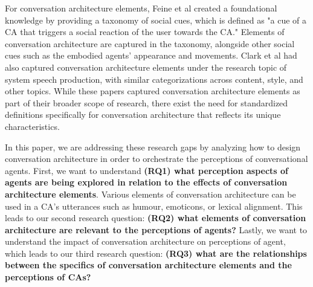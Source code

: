 \documentclass[sigconf,screen,review, anonymous]{acmart}
\begin{document}
For conversation architecture elements, Feine et al \cite{feine2019taxonomy} created a foundational knowledge by providing a taxonomy of social cues, which is defined as "a cue of a CA that triggers a social reaction of the user towards the CA." Elements of conversation architecture are captured in the taxonomy, alongside other social cues such as the embodied agents' appearance and movements. Clark et al \cite{clark2019state} had also captured conversation architecture elements under the research topic of system speech production, with similar categorizations across content, style, and other topics. While these papers captured conversation architecture elements as part of their broader scope of research, there exist the need for standardized definitions specifically for conversation architecture that reflects its unique characteristics.


In this paper, we are addressing these research gaps by analyzing how to design conversation architecture in order to orchestrate the perceptions of conversational agents. First, we want to understand \textbf{(RQ1) what perception aspects of agents are being explored in relation to the effects of conversation architecture elements}. Various elements of conversation architecture can be used in a CA's utterances such as humour, emoticons, or lexical alignment. This leads to our second research question: \textbf{(RQ2) what elements of conversation architecture are relevant to the perceptions of agents?} Lastly, we want to understand the impact of conversation architecture on perceptions of agent, which leads to our third research question: \textbf{(RQ3) what are the relationships between the specifics of conversation architecture elements and the perceptions of CAs?}
\end{document}
